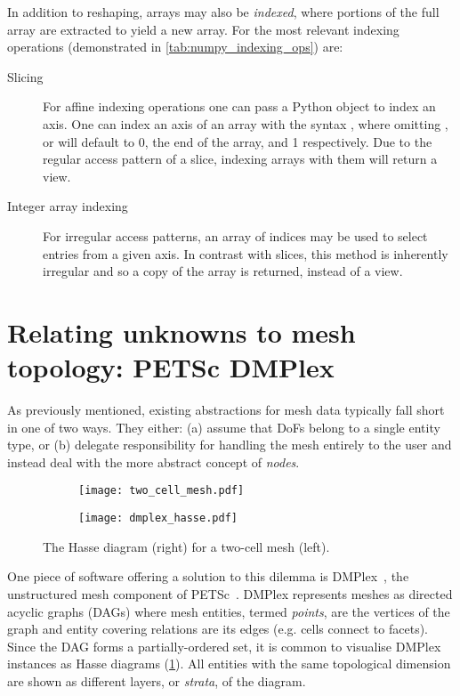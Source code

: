 \documentclass[thesis]{subfiles}
\begin{document}
In addition to reshaping, arrays may also be \textit{indexed}, where portions of the full array are extracted to yield a new array.
For  the most relevant indexing operations (demonstrated in \cref{tab:numpy_indexing_ops}) are:

\begin{description}
  \item[Slicing]
    For affine indexing operations one can pass a Python  object to index an axis.
    One can index an axis of an array with the syntax , where omitting ,  or  will default to 0, the end of the array, and 1 respectively.
    Due to the regular access pattern of a slice, indexing \numpy arrays with them will return a view.

  \item[Integer array indexing]
    For irregular access patterns, an array of indices may be used to select entries from a given axis.
    In contrast with slices, this method is inherently irregular and so a copy of the array is returned, instead of a view.
\end{description}

\section{Relating unknowns to mesh topology: PETSc DMPlex}
\label{sec:foundations_dmplex}

As previously mentioned, existing abstractions for mesh data typically fall short in one of two ways.
They either:
(a) assume that DoFs belong to a single entity type, or
(b) delegate responsibility for handling the mesh entirely to the user and instead deal with the more abstract concept of \emph{nodes}.

\begin{figure}
  \centering
  \begin{subfigure}{.49\textwidth}
    \centering
    \texttt{[image: two\_cell\_mesh.pdf]}
  \end{subfigure}
  \begin{subfigure}{.49\textwidth}
    \centering
    \texttt{[image: dmplex\_hasse.pdf]}
  \end{subfigure}
  \caption{
    The Hasse diagram (right) for a two-cell mesh (left).
  }
  \label{fig:dmplex_hasse}
\end{figure}


One piece of software offering a solution to this dilemma is DMPlex~\cite{knepleyMeshAlgorithmsPDE2009,knepleyUnstructuredOverlappingMesh2015,langeEfficientMeshManagement2016}, the unstructured mesh component of PETSc~\cite{petsc-efficient,petsc-user-ref,petsc-web-page}.
DMPlex represents meshes as directed acyclic graphs (DAGs) where mesh entities, termed \emph{points}, are the vertices of the graph and entity covering relations are its edges (e.g. cells connect to facets).
Since the DAG forms a partially-ordered set, it is common to visualise DMPlex instances as Hasse diagrams (\cref{fig:dmplex_hasse}).
All entities with the same topological dimension are shown as different layers, or \emph{strata}, of the diagram.
\end{document}
